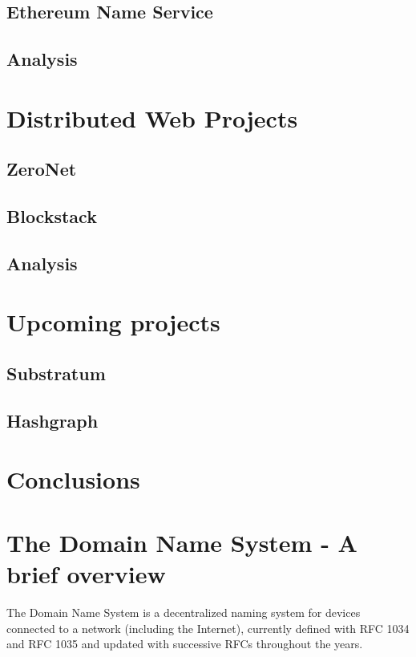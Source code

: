\documentclass[mscthesis]{usiinfthesis}
\begin{document}
\section{Ethereum Name Service}\label{proj:ens}

\section{Analysis}


\chapter{Distributed Web Projects}

\section{ZeroNet}\label{proj:zeronet}

\section{Blockstack}\label{proj:blockstack}

\section{Analysis}


\chapter{Upcoming projects}

\section{Substratum}

\section{Hashgraph}


\chapter{Conclusions}


\appendix 

\chapter{The Domain Name System - A brief overview}\label{appx:dns}
The Domain Name System is a decentralized naming system for devices connected to a network (including the Internet), currently defined with RFC 1034\cite{rfc:1034} and RFC 1035\cite{rfc:1035} and updated with successive RFCs throughout the years.
\end{document}
